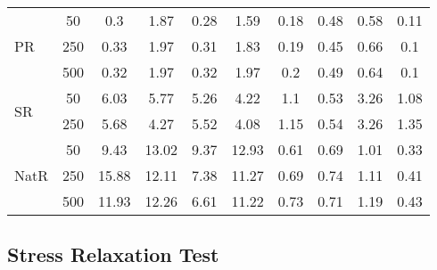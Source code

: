 \begin{table*}[htb!]
\begin{tabular}{lccccccccc}
\hline
\multirow{3}{*}{PR}      & 50    & 0.3        & 1.87       & 0.28    & 1.59    & 0.18    & 0.48    & 0.58     & 0.11      \\
                           & 250   & 0.33       & 1.97       & 0.31    & 1.83    & 0.19    & 0.45    & 0.66     & 0.1       \\
                           & 500   & 0.32       & 1.97       & 0.32    & 1.97    & 0.2     & 0.49    & 0.64     & 0.1       \\
\hline
\multirow{2}{*}{SR}      & 50    & 6.03       & 5.77       & 5.26    & 4.22    & 1.1     & 0.53    & 3.26     & 1.08      \\
                           & 250   & 5.68       & 4.27       & 5.52    & 4.08    & 1.15    & 0.54    & 3.26     & 1.35      \\
\hline
\multirow{3}{*}{NatR} & 50    & 9.43       & 13.02      & 9.37    & 12.93   & 0.61    & 0.69    & 1.01     & 0.33      \\
                           & 250   & 15.88      & 12.11      & 7.38    & 11.27   & 0.69    & 0.74    & 1.11     & 0.41      \\
                           & 500   & 11.93      & 12.26      & 6.61    & 11.22   & 0.73    & 0.71    & 1.19     & 0.43     \\
\bottomrule
\end{tabular}
\end{table*}


\subsection{Stress Relaxation Test}


